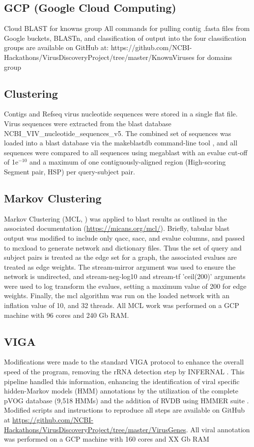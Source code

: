  \subsection{GCP (Google Cloud Computing)}
  Cloud BLAST
  for knowns group
  All commands for pulling contig .fasta files from Google buckets, BLASTn, and classification of output into the four classification groups are available on GitHub at: https://github.com/NCBI-Hackathons/VirusDiscoveryProject/tree/master/KnownViruses
  for domains group

  \subsection{Clustering}
  Contigs and Refseq virus nucleotide sequences were stored in a single flat
  file. Virus sequences were extracted from the blast database
  NCBI\_VIV\_nucleotide\_sequences\_v5. The combined set of sequences was
  loaded into a blast database via the makeblastdb command-line tool
  \cite{Camacho2009}, and all sequences were compared to all sequences using
  megablast \cite{Camacho2009} with an evalue cut-off of 1e$^{-10}$ and a
  maximum of one contiguously-aligned region (High-scoring Segment pair, HSP)
  per query-subject pair.


  \subsection{Markov Clustering}
  Markov Clustering (MCL, \cite{Enright2002}) was applied to blast results as
  outlined in the associated documentation (\url{https://micans.org/mcl/}).
  Briefly, tabular blast output was modified to include only qacc, sacc, and
  evalue columns, and passed to mcxload to generate network and dictionary
  files. Thus the set of query and subject pairs is treated as the edge set for
  a graph, the associated evalues are treated as edge weights. The
  stream-mirror argument was used to ensure the network is undirected, and
  stream-neg-log10  and stream-tf 'ceil(200)' arguments were used to log
  transform the evalues, setting a maximum value of 200 for edge weights.
  Finally, the mcl algorithm was run on the loaded network with an inflation
  value of 10, and 32 threads. All MCL work was performed on a GCP machine with
  96 cores and 240 Gb RAM.

  \subsection{VIGA}

  Modifications were made to the standard VIGA \cite{Gonzalez-Tortuero2018}
  protocol to enhance the overall speed of the program, removing the rRNA
  detection step by INFERNAL \cite{Nawrocki2013}. This pipeline handled this
  information, enhancing the identification of viral specific hidden-Markov
  models (HMM) annotations by the utilization of the complete pVOG database
  \cite{Grazziotin2017} (9,518 HMMs) and the addition of RVDB
  \cite{Goodacre2018} using HMMER suite \cite{hmmer}. Modified scripts and
  instructions to reproduce all steps are available on GitHub at
  \url{https://github.com/NCBI-Hackathons/VirusDiscoveryProject/tree/master/VirusGenes}.
  All viral annotation was performed on a GCP machine with 160 cores and XX Gb
  RAM

